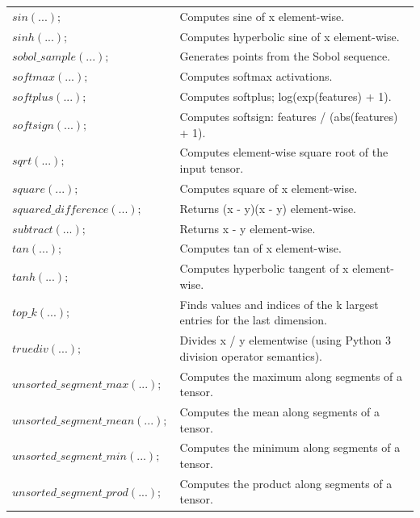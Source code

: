 \documentclass[12pt]{report}
\begin{document}
\begin{longtable}{ p{} | p{}}
$sin(...);$ & Computes sine of x element-wise. \\ 

$sinh(...);$ & Computes hyperbolic sine of x element-wise. \\ 

$sobol\_sample(...);$ & Generates points from the Sobol sequence. \\ 

$softmax(...);$ & Computes softmax activations. \\ 

$softplus(...);$ & Computes softplus; log(exp(features) + 1). \\ 

$softsign(...);$ & Computes softsign: features / (abs(features) + 1). \\ 

$sqrt(...);$ & Computes element-wise square root of the input tensor. \\ 

$square(...);$ & Computes square of x element-wise. \\ 

$squared\_difference(...);$ & Returns (x - y)(x - y) element-wise. \\ 

$subtract(...);$ & Returns x - y element-wise. \\ 

$tan(...);$ & Computes tan of x element-wise. \\ 

$tanh(...);$ & Computes hyperbolic tangent of x element-wise. \\ 

$top\_k(...);$ & Finds values and indices of the k largest entries for the last dimension. \\ 

$truediv(...);$ & Divides x / y elementwise (using Python 3 division operator semantics). \\ 

$unsorted\_segment\_max(...);$ & Computes the maximum along segments of a tensor. \\ 

$unsorted\_segment\_mean(...);$ & Computes the mean along segments of a tensor. \\ 

$unsorted\_segment\_min(...);$ & Computes the minimum along segments of a tensor. \\ 

$unsorted\_segment\_prod(...);$ & Computes the product along segments of a tensor. \\ 


\end{longtable}
\end{document}

